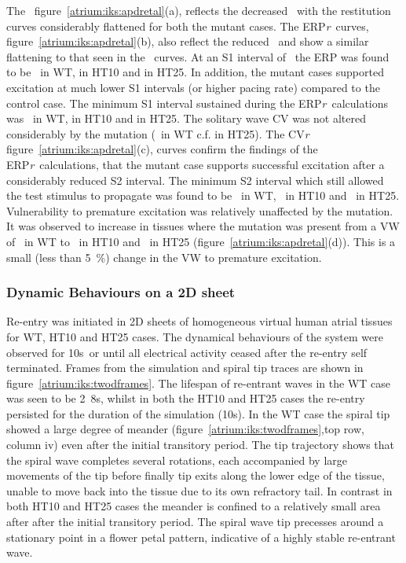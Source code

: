 The \apdr\, figure~\ref{atrium:iks:apdretal}(a), reflects the decreased \apd\ with
the restitution curves considerably flattened for both the mutant cases.
The ERP\emph{r}\ curves, figure~\ref{atrium:iks:apdretal}(b), also reflect the
reduced \apd\ and show a similar flattening to that seen in the \apdr\ curves.
At an S1 interval of \ the ERP was found to be \ in WT,
 in HT10 and  in HT25.
In addition, the mutant cases supported excitation at much lower S1 intervals
(or higher pacing rate) compared to the control case.
The minimum S1 interval sustained during the ERP\emph{r}\ calculations was
\ in WT,  in HT10 and  in HT25.
The solitary wave CV was not altered considerably by the mutation (\
in WT c.f.  in HT25).
The CV\emph{r}\, figure~\ref{atrium:iks:apdretal}(c), curves confirm the findings
of the ERP\emph{r}\ calculations, that the mutant case supports successful
excitation after a considerably reduced S2 interval.
The minimum S2 interval which still allowed the test stimulus to propagate was
found to be \ms{317.1}\ in WT, \ms{151.7}\ in HT10 and \ms{92.5}\ in HT25.
Vulnerability to premature excitation was relatively unaffected by the mutation.
It was observed to increase in tissues where the mutation was present from a VW of
\ms{3.2}\ in WT to \ms{3.4}\ in HT10 and \ms{3.3}\ in HT25
(figure~\ref{atrium:iks:apdretal}(d)).
This is a small (less than 5~\%) change in the VW to premature excitation.

\subsubsection{Dynamic Behaviours on a 2D sheet}

Re-entry was initiated in 2D sheets of homogeneous virtual human atrial tissues
for WT, HT10 and HT25 cases.
The dynamical behaviours of the system were observed for \unit{10}{s}\ or until
all electrical activity ceased after the re-entry self terminated.
Frames from the simulation and spiral tip traces are shown in
figure~\ref{atrium:iks:twodframes}.
The lifespan of re-entrant waves in the WT case was seen to be \unit{2.8}{s},
whilst in both the HT10 and HT25 cases the re-entry persisted for the duration
of the simulation (\unit{10}{s}).
In the WT case the spiral tip showed a large degree of meander
(figure~\ref{atrium:iks:twodframes},top row, column iv) even after the initial
transitory period.
The tip trajectory shows that the spiral wave completes several rotations, each
accompanied by large movements of the tip before finally tip exits along the
lower edge of the tissue, unable to move back into the tissue due to its own
refractory tail.
In contrast in both HT10 and HT25 cases the meander is confined to a relatively
small area after after the initial transitory period.
The spiral wave tip precesses around a stationary point in a flower petal
pattern, indicative of a highly stable re-entrant wave.

